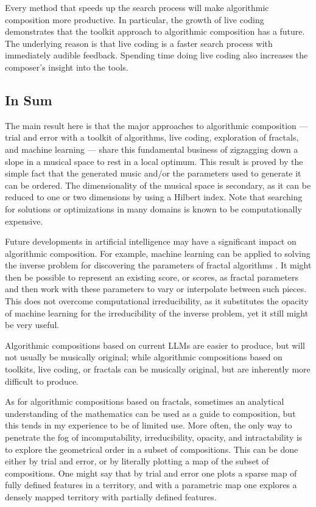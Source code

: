\documentclass[11pt]{scrartcl}
\begin{document}
Every method that speeds up the search process will make algorithmic composition more productive. In particular, the growth of live coding demonstrates that the toolkit approach to algorithmic composition has a future. The underlying reason is that live coding is a faster search process with immediately audible feedback. Spending time doing live coding also increases the composer's insight into the tools.

\subsection*{In Sum}

The main result here is that the major approaches to algorithmic composition --- trial and error with a toolkit of algorithms, live coding, exploration of fractals, and machine learning --- share this fundamental business of zigzagging down a slope in a musical space to rest in a local optimum. This result is proved  by the simple fact that the generated music and/or the parameters used to generate it can be ordered. The dimensionality of the musical space is secondary, as it can be reduced to one or two dimensions by using a Hilbert index. Note that searching for solutions or optimizations in many domains is known to be computationally expensive.

Future developments in artificial intelligence may have a significant impact on algorithmic composition. For example, machine learning can be applied to solving the inverse problem for discovering the parameters of fractal algorithms \parencite{tu2023learning}. It might then be possible to represent an existing score, or scores, as fractal parameters and then work with these parameters to vary or interpolate between such pieces. This does not overcome computational irreducibility, as it substitutes the opacity of machine learning for the irreducibility of the inverse problem, yet it still might be very useful.

 Algorithmic compositions based on current LLMs are easier to produce, but will not usually be musically original; while algorithmic compositions based on toolkits, live coding, or fractals can be musically original, but are inherently more difficult to produce.

As for algorithmic compositions based on fractals, sometimes an analytical understanding of the mathematics can be used as a guide to composition, but this tends in my experience to be of limited use. More often, the only way to penetrate the fog of incomputability, irreducibility, opacity, and intractability is to explore the geometrical order in a subset of compositions. This can be done either by trial and error, or by literally plotting a map of the subset of compositions. One might say that by trial and error one plots a sparse map of fully defined features in a territory, and with a parametric map one explores a densely mapped territory with partially defined features.
\end{document}
